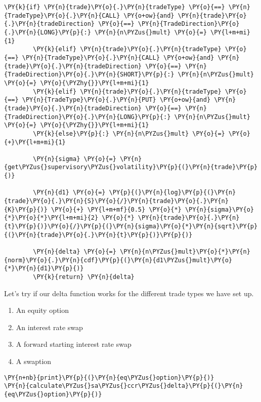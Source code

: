 \begin{tcolorbox}[breakable, size=fbox, boxrule=1pt, pad at break*=1mm,colback=cellbackground, colframe=cellborder]
\begin{Verbatim}[commandchars=\\\{\}]
        \PY{k}{if} \PY{n}{trade}\PY{o}{.}\PY{n}{tradeType} \PY{o}{==} \PY{n}{TradeType}\PY{o}{.}\PY{n}{CALL} \PY{o+ow}{and} \PY{n}{trade}\PY{o}{.}\PY{n}{tradeDirection} \PY{o}{==} \PY{n}{TradeDirection}\PY{o}{.}\PY{n}{LONG}\PY{p}{:} \PY{n}{n\PYZus{}mult} \PY{o}{=} \PY{l+m+mi}{1}
        \PY{k}{elif} \PY{n}{trade}\PY{o}{.}\PY{n}{tradeType} \PY{o}{==} \PY{n}{TradeType}\PY{o}{.}\PY{n}{CALL} \PY{o+ow}{and} \PY{n}{trade}\PY{o}{.}\PY{n}{tradeDirection} \PY{o}{==} \PY{n}{TradeDirection}\PY{o}{.}\PY{n}{SHORT}\PY{p}{:} \PY{n}{n\PYZus{}mult} \PY{o}{=} \PY{o}{\PYZhy{}}\PY{l+m+mi}{1}
        \PY{k}{elif} \PY{n}{trade}\PY{o}{.}\PY{n}{tradeType} \PY{o}{==} \PY{n}{TradeType}\PY{o}{.}\PY{n}{PUT} \PY{o+ow}{and} \PY{n}{trade}\PY{o}{.}\PY{n}{tradeDirection} \PY{o}{==} \PY{n}{TradeDirection}\PY{o}{.}\PY{n}{LONG}\PY{p}{:} \PY{n}{n\PYZus{}mult} \PY{o}{=} \PY{o}{\PYZhy{}}\PY{l+m+mi}{1}
        \PY{k}{else}\PY{p}{:} \PY{n}{n\PYZus{}mult} \PY{o}{=} \PY{o}{+}\PY{l+m+mi}{1}
        
        \PY{n}{sigma} \PY{o}{=} \PY{n}{get\PYZus{}supervisory\PYZus{}volatility}\PY{p}{(}\PY{n}{trade}\PY{p}{)}
        
        \PY{n}{d1} \PY{o}{=} \PY{p}{(}\PY{n}{log}\PY{p}{(}\PY{n}{trade}\PY{o}{.}\PY{n}{S}\PY{o}{/}\PY{n}{trade}\PY{o}{.}\PY{n}{K}\PY{p}{)} \PY{o}{+} \PY{l+m+mf}{0.5} \PY{o}{*} \PY{n}{sigma}\PY{o}{*}\PY{o}{*}\PY{l+m+mi}{2} \PY{o}{*} \PY{n}{trade}\PY{o}{.}\PY{n}{t}\PY{p}{)}\PY{o}{/}\PY{p}{(}\PY{n}{sigma}\PY{o}{*}\PY{n}{sqrt}\PY{p}{(}\PY{n}{trade}\PY{o}{.}\PY{n}{t}\PY{p}{)}\PY{p}{)}
        
        \PY{n}{delta} \PY{o}{=} \PY{n}{n\PYZus{}mult}\PY{o}{*}\PY{n}{norm}\PY{o}{.}\PY{n}{cdf}\PY{p}{(}\PY{n}{d1\PYZus{}mult}\PY{o}{*}\PY{n}{d1}\PY{p}{)}
        \PY{k}{return} \PY{n}{delta}
\end{Verbatim}
\end{tcolorbox}

    Let's try if our delta function works for the different trade types we
have set up.

\begin{enumerate}
\def\labelenumi{\arabic{enumi}.}
\tightlist
\item
  An equity option
\item
  An interest rate swap
\item
  A forward starting interest rate swap
\item
  A swaption
\end{enumerate}

    \begin{tcolorbox}[breakable, size=fbox, boxrule=1pt, pad at break*=1mm,colback=cellbackground, colframe=cellborder]
\begin{Verbatim}[commandchars=\\\{\}]
\PY{n+nb}{print}\PY{p}{(}\PY{n}{eq\PYZus{}option}\PY{p}{)}
\PY{n}{calculate\PYZus{}sa\PYZus{}ccr\PYZus{}delta}\PY{p}{(}\PY{n}{eq\PYZus{}option}\PY{p}{)}
\end{Verbatim}
\end{tcolorbox}

